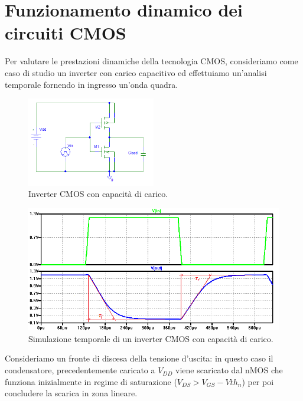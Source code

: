 \section{Funzionamento dinamico dei circuiti CMOS}
\label{sec:funzionamentoDinamicoCMOS}

Per valutare le prestazioni dinamiche della tecnologia CMOS, consideriamo come caso di studio un inverter con carico capacitivo ed effettuiamo un'analisi temporale fornendo in ingresso un'onda quadra.

\begin{figure}[hbt!]
	\centering
	\includegraphics[width=0.5\textwidth]{figure/Sch_InverterCMOS.PNG}
	\caption{Inverter CMOS con capacità di carico.}
	\label{fig:fig_sch_inverterCMOS}
\end{figure}

\begin{figure}[hbt!]
	\centering
	\includegraphics[width=1\textwidth]{figure/Sim_InverterCMOS(chiaro)WithNotes.png}
	\caption{Simulazione temporale di un inverter CMOS con capacità di carico.}
	\label{fig:fig_sim_inverterCMOS}
\end{figure}

Consideriamo un fronte di discesa della tensione d'uscita: in questo caso il condensatore, precedentemente caricato a $V_{DD}$ viene scaricato dal nMOS che funziona inizialmente in regime di saturazione ($V_{DS}>V_{GS}-V{th_n}$) per poi concludere la scarica in zona lineare. 


